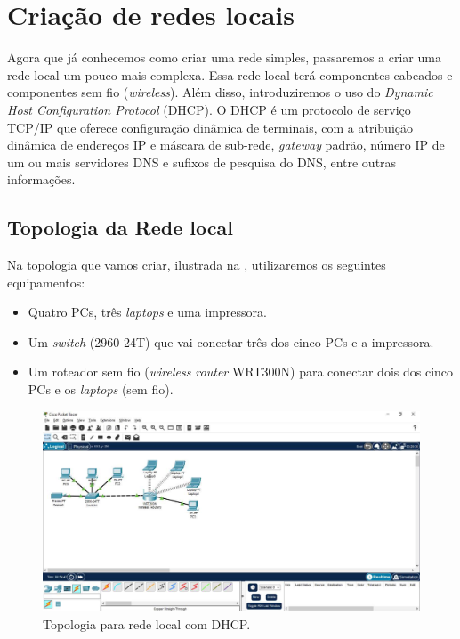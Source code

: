 \chapter{Criação de redes locais}\label{chp:redesCompletas}
Agora que já conhecemos como criar uma rede simples, passaremos a criar uma rede local um pouco mais complexa. Essa rede local terá componentes cabeados e componentes sem fio (\textit{wireless}). Além disso, introduziremos o uso do \textit{Dynamic Host Configuration Protocol} (DHCP). O DHCP é um protocolo de serviço TCP/IP que oferece configuração dinâmica de terminais, com a atribuição dinâmica de endereços IP e máscara de sub-rede, \textit{gateway} padrão, número IP de um ou mais servidores DNS e sufixos de pesquisa do DNS, entre outras informações.

\section{Topologia da Rede local}\label{sec:testeSec}
Na topologia que vamos criar, ilustrada na , utilizaremos os seguintes equipamentos:
\begin{itemize}
    \item Quatro PCs, três \textit{laptops} e uma impressora.
    \item Um \textit{switch} (2960-24T) que vai conectar três dos cinco PCs e a impressora.
    \item Um roteador sem fio (\textit{wireless router} WRT300N) para conectar dois dos cinco PCs e os \textit{laptops} (sem fio).
\end{itemize}

\begin{figure}[!hbt]
    \centering
    \includegraphics[width=.99\textwidth]{Figuras/RedeCompleta1}
    \caption{Topologia para rede local com DHCP.}\label{fig:topDHCP}
\end{figure}


